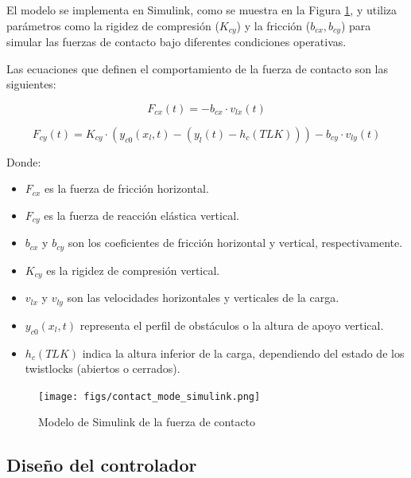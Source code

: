 \documentclass{article}
\begin{document}
            El modelo se implementa en Simulink, como se muestra en la Figura \ref{fig:contact_mode_simulink}, y utiliza parámetros como la rigidez de compresión ($K_{cy}$) y la fricción ($b_{cx}, b_{cy}$) para simular las fuerzas de contacto bajo diferentes condiciones operativas. 

            Las ecuaciones que definen el comportamiento de la fuerza de contacto son las siguientes:

            \begin{equation}
            F_{cx}(t) = -b_{cx} \cdot v_{lx}(t)
            \end{equation}

            \begin{equation}
            F_{cy}(t) = K_{cy} \cdot (y_{c0}(x_l, t) - (y_l(t) - h_c(TLK))) - b_{cy} \cdot v_{ly}(t)
            \end{equation}

            Donde:
            \begin{itemize}
                \item $F_{cx}$ es la fuerza de fricción horizontal.
                \item $F_{cy}$ es la fuerza de reacción elástica vertical.
                \item $b_{cx}$ y $b_{cy}$ son los coeficientes de fricción horizontal y vertical, respectivamente.
                \item $K_{cy}$ es la rigidez de compresión vertical.
                \item $v_{lx}$ y $v_{ly}$ son las velocidades horizontales y verticales de la carga.
                \item $y_{c0}(x_l, t)$ representa el perfil de obstáculos o la altura de apoyo vertical.
                \item $h_c(TLK)$ indica la altura inferior de la carga, dependiendo del estado de los twistlocks (abiertos o cerrados).
            \end{itemize}

            \begin{figure}
                \centering
                \texttt{[image: figs/contact\_mode\_simulink.png]}
                \caption{Modelo de Simulink de la fuerza de contacto}
                \label{fig:contact_mode_simulink}
            \end{figure}
                
        \subsection{Diseño del controlador}
\end{document}
